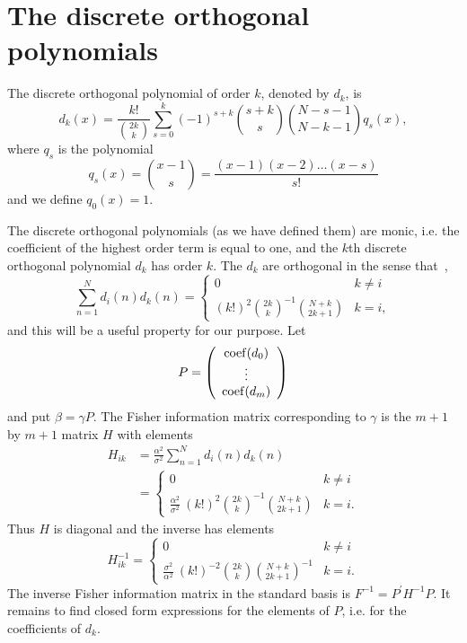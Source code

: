 \documentclass[journal,10pt]{IEEEtran}
\begin{document}
\section{The discrete orthogonal polynomials}\label{sec:discr-orth-polyn}

\begin{definition}  \label{def:discreteLegendepolys}
The discrete orthogonal polynomial of order $k$, denoted by $d_k$, is
\[
d_k(x) = \frac{k!}{\binom{2k}{k}}\sum_{s=0}^k{(-1)^{s+k}\binom{s+k}{s}\binom{N-s-1}{N-k-1}q_s(x)},
\]
where $q_s$ is the polynomial
\[
q_s(x) = \binom{x-1}{s} = \frac{(x-1)(x-2)\dots(x-s)}{s!}
\]
and we define $q_0(x) = 1$.
\end{definition}
The discrete orthogonal polynomials (as we have defined them) are monic, i.e. the coefficient of the highest order term is equal to one, and the $k$th discrete orthogonal polynomial $d_k$ has order $k$.  The $d_k$ are orthogonal in the sense that~\cite{Szego1975_ortho_polynomials,Eisinberg2001_Vandermonde_rect,Eisinberg2007_discerete_otho_poly_equidist},
\[
\sum_{n=1}^{N}{ d_i(n) d_k(n) } = \begin{cases}
0 &  k\neq i \\
(k!)^2 \binom{2k}{k}^{-1} \binom{N+k}{2k+1}  & k = i,
\end{cases}
\]
and this will be a useful property for our purpose.  Let 
\[
P = \left( \begin{array}{c}
\operatorname{coef}(d_0) \\
\vdots \\
\operatorname{coef}(d_m)
\end{array} \right)
\]
and put $\beta = \gamma P$.  The Fisher information matrix corresponding to $\gamma$ is the $m+1$ by $m+1$ matrix $H$ with elements
\begin{align*}
H_{ik} &= \frac{\alpha^2}{\sigma^2}\sum_{n=1}^{N} d_{i}(n) d_{k}(n) \\
&= \begin{cases}
0 &  k\neq i \\
 \frac{\alpha^2}{\sigma^2}\ (k!)^2 \binom{2k}{k}^{-1} \binom{N+k}{2k+1}  & k = i.
\end{cases}
\end{align*}
Thus $H$ is diagonal and the inverse has elements
\[
H_{ik}^{-1} = \begin{cases}
0 &  k\neq i \\
 \frac{\sigma^2}{\alpha^2}\ (k!)^{-2} \binom{2k}{k} \binom{N+k}{2k+1}^{-1}  & k = i.
\end{cases}
\] 
The inverse Fisher information matrix in the standard basis is $F^{-1} = P^\prime H^{-1} P$.  It remains to find closed form expressions for the elements of $P$, i.e. for the coefficients of $d_k$.  
\end{document}
